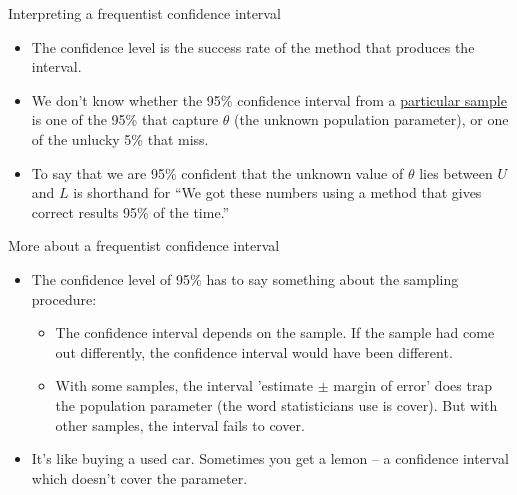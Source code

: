 \documentclass[10pt,handout]{beamer}\usepackage[]{graphicx}\usepackage[]{color}
\begin{document}
\begin{frame}{Interpreting a frequentist confidence interval}
	\begin{itemize}
		\setlength\itemsep{1em}
		\item The confidence level is the success rate of the method that produces the interval. \pause
		\item We don't know whether the 95\% confidence interval from a \underline{particular
			sample} is one of the 95\% that capture $\theta$ (the unknown population parameter), or one of the unlucky 5\% that miss. \pause
		\item To say that we are 95\% confident that the unknown value of $\theta$
		lies between $U$ and $L$ is shorthand for ``We got these numbers using a
		method that gives correct results 95\% of the time.''
	\end{itemize}
\end{frame}



\begin{frame}{More about a frequentist confidence interval}
	
	\begin{itemize}
		\item The confidence level of 95\% has to say something about the sampling procedure: 
		
		\begin{itemize}
			\item The confidence interval depends on the sample. If the sample had come out differently, the confidence interval would have been different. 
			\item With some samples, the interval 'estimate $\pm$ margin of error' does trap the population parameter (the word statisticians use is cover). But with other samples, the interval fails to cover.
		\end{itemize}
		\pause
		\item It's like buying a used car. Sometimes you get a lemon – a confidence interval which doesn't cover the parameter.
		
	\end{itemize}
\end{frame}
\end{document}
